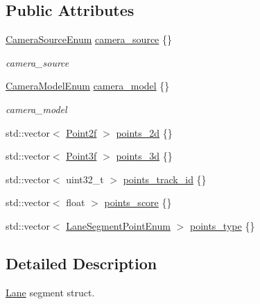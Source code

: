 \subsection*{Public Attributes}
\begin{DoxyCompactItemize}
\item 
\hyperlink{structmaf__perception__interface_1_1CameraSourceEnum}{Camera\+Source\+Enum} \hyperlink{structmaf__perception__interface_1_1LaneSegment_a98ae9c45229a782f28e5b2928ea717c8}{camera\+\_\+source} \{\}
\begin{DoxyCompactList}\small\item\em camera\+\_\+source \end{DoxyCompactList}\item 
\hyperlink{structmaf__perception__interface_1_1CameraModelEnum}{Camera\+Model\+Enum} \hyperlink{structmaf__perception__interface_1_1LaneSegment_a69c5de9e6bd79886368668e8aba4a0d6}{camera\+\_\+model} \{\}
\begin{DoxyCompactList}\small\item\em camera\+\_\+model \end{DoxyCompactList}\item 
std\+::vector$<$ \hyperlink{structmaf__perception__interface_1_1Point2f}{Point2f} $>$ \hyperlink{structmaf__perception__interface_1_1LaneSegment_af678e56c309a0a96d3730c39fe684e84}{points\+\_\+2d} \{\}
\item 
std\+::vector$<$ \hyperlink{structmaf__perception__interface_1_1Point3f}{Point3f} $>$ \hyperlink{structmaf__perception__interface_1_1LaneSegment_afea460c83a0a87f91a951c53bbe911bb}{points\+\_\+3d} \{\}
\item 
std\+::vector$<$ uint32\+\_\+t $>$ \hyperlink{structmaf__perception__interface_1_1LaneSegment_aa9dd724ba5c33a9d1d5ed99b82d504cd}{points\+\_\+track\+\_\+id} \{\}
\item 
std\+::vector$<$ float $>$ \hyperlink{structmaf__perception__interface_1_1LaneSegment_a682d4303bbe77667cf7458e55c2852ed}{points\+\_\+score} \{\}
\item 
std\+::vector$<$ \hyperlink{structmaf__perception__interface_1_1LaneSegmentPointEnum}{Lane\+Segment\+Point\+Enum} $>$ \hyperlink{structmaf__perception__interface_1_1LaneSegment_a6606c5cbcda9805836046446bc2c3278}{points\+\_\+type} \{\}
\end{DoxyCompactItemize}


\subsection{Detailed Description}
\hyperlink{structmaf__perception__interface_1_1Lane}{Lane} segment struct. 

